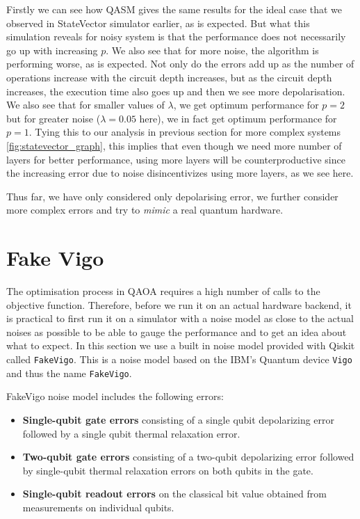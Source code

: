 Firstly we can see how QASM gives the same results for the ideal case that we observed in StateVector simulator earlier, as is expected.
But what this simulation reveals for noisy system is that the performance does not necessarily go up with increasing $p$.
We also see that for more noise, the algorithm is performing worse, as is expected.
Not only do the errors add up as the number of operations increase with the circuit depth increases, but as the circuit depth increases, the execution time also goes up and then we see more depolarisation.
We also see that for smaller values of $\lambda$, we get optimum performance for $p=2$ but for greater noise ($\lambda = 0.05$ here), we in fact get optimum performance for $p = 1$.
Tying this to our analysis in previous section for more complex systems \ref{fig:statevector_graph}, this implies that even though we need more number of layers for better performance, using more layers will be counterproductive since the increasing error due to noise disincentivizes using more layers, as we see here.

Thus far, we have only considered only depolarising error, we further consider more complex errors and try to \textit{mimic} a real quantum hardware.

\section{Fake Vigo}
\label{fakevigo_section}

The optimisation process in QAOA requires a high number of calls to the objective function. Therefore, before we run it on an actual hardware backend, it is practical to first run it on a simulator with a noise model as close to the actual noises as possible to be able to gauge the performance and to get an idea about what to expect. In this section we use a built in noise model provided with Qiskit called \texttt{FakeVigo}. This is a noise model based on the IBM's Quantum device \texttt{Vigo} and thus the name \texttt{FakeVigo}.


FakeVigo noise model includes the following errors:
\begin{itemize}
    \item \textbf{Single-qubit gate errors} consisting of a single qubit depolarizing error followed by a single qubit thermal relaxation error.
    \item \textbf{Two-qubit gate errors} consisting of a two-qubit depolarizing error followed by single-qubit thermal relaxation errors on both qubits in the gate.
    \item \textbf{Single-qubit readout errors} on the classical bit value obtained from measurements on individual qubits.
\end{itemize}

